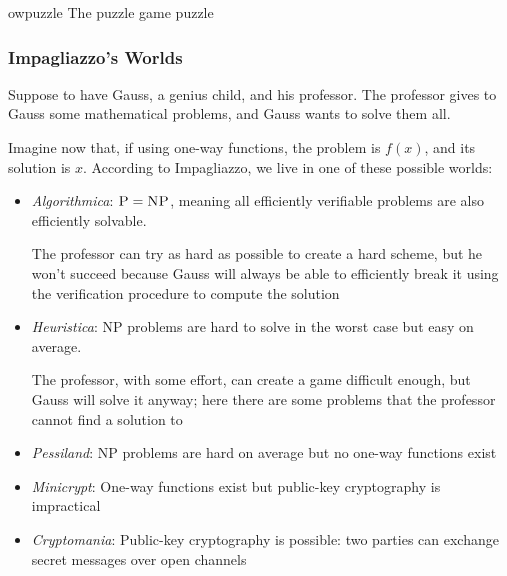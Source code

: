 \begin{cryptogame}
    {owpuzzle}
    {The puzzle game}
    {puzzle}


    \cseqdelay


\end{cryptogame}

\subsubsection{Impagliazzo's Worlds}

Suppose to have Gauss, a genius child, and his professor. The professor gives to Gauss some mathematical problems, and Gauss wants to solve them all.

Imagine now that, if using one-way functions, the problem is $f(x)$, and its solution is $x$. According to Impagliazzo, we live in one of these possible worlds:
\begin{itemize}
    \item \textit{Algorithmica}: $\textsc{P} = \textsc{NP}$, meaning all efficiently verifiable problems are also efficiently solvable. 
    
    The professor can try as hard as possible to create a hard scheme, but he won't succeed because Gauss will always be able to efficiently break it using the verification procedure to compute the solution

    \item \textit{Heuristica}: \textsc{NP} problems are hard to solve in the worst case but easy on average. 
    
    The professor, with some effort, can create a game difficult enough, but Gauss will solve it anyway; here there are some problems that the professor cannot find a solution to

    \item \textit{Pessiland}: \textsc{NP} problems are hard on average but no one-way functions exist
    
    \item \textit{Minicrypt}: One-way functions exist but public-key cryptography is impractical
    
    \item \textit{Cryptomania}: Public-key cryptography is possible: two parties can exchange secret messages over open channels
\end{itemize}
    
